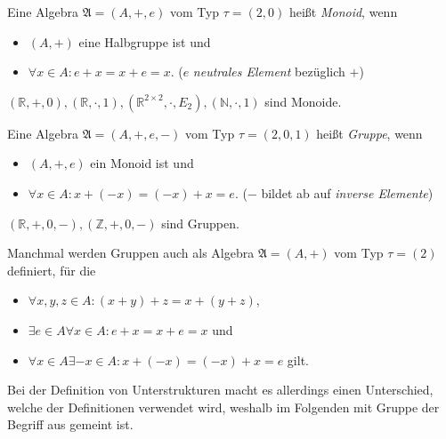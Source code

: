 \begin{definition}
    Eine Algebra $\mathfrak{A} = (A, +, e)$ vom Typ $\tau = (2,0)$ heißt \emph{Monoid}, wenn
    \begin{itemize}[topsep=0pt, label={--}]
        \item $(A, +)$ eine Halbgruppe ist und
        \item $\forall x \in A: e + x = x + e = x$. \tab ($e$ \emph{neutrales Element} bezüglich $+$)
    \end{itemize}
\end{definition}

\begin{example}
    $(\mathbb{R}, +, 0), (\mathbb{R}, \cdot, 1), (\mathbb{R}^{2\times 2}, \cdot, E_2), (\mathbb{N}, \cdot, 1)$ sind Monoide.
\end{example}

\begin{definition}\label{def:gruppe}
    Eine Algebra $\mathfrak{A} = (A, +, e, -)$ vom Typ $\tau = (2,0,1)$ heißt \emph{Gruppe}, wenn
    \begin{itemize}[topsep=0pt, label={--}]
        \item $(A, +, e)$ ein Monoid ist und
        \item $\forall x \in A: x + (-x) = (-x) + x = e$. \tab ($-$ bildet ab auf \emph{inverse Elemente})
    \end{itemize}
\end{definition}

\begin{example}
    $(\mathbb{R},+, 0, -), (\mathbb{Z}, +, 0, -)$ sind Gruppen.
\end{example}

\begin{remark}\label{rem:alternativegruppe}
    Manchmal werden Gruppen auch als Algebra $\mathfrak{A} = (A, +)$ vom Typ $\tau = (2)$ definiert, für die
    \begin{itemize}[topsep=0pt, label={--}]
        \item $\forall x,y,z \in A: (x + y) + z = x + (y + z)$,
        \item $\exists e \in A \forall x \in A: e + x = x + e = x$ und 
        \item $\forall x \in A \exists -x \in A: x + (-x) = (-x) + x = e$ gilt.
    \end{itemize}
   Bei der Definition von Unterstrukturen macht es allerdings einen Unterschied, welche der Definitionen verwendet wird, weshalb im Folgenden mit Gruppe der Begriff aus  gemeint ist.
\end{remark}

